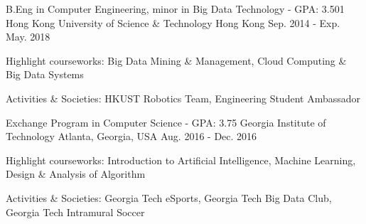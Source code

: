

\begin{cventries}

  \cventry
    {B.Eng in Computer Engineering, minor in Big Data Technology - GPA: 3.501} %
    {Hong Kong University of Science \& Technology} %
    {Hong Kong} %
    {Sep. 2014 - Exp. May. 2018} %
    {
      \begin{cvitems} %
        \item Highlight courseworks: Big Data Mining \& Management, Cloud Computing \& Big Data Systems
        \item Activities \& Societies: HKUST Robotics Team, Engineering Student Ambassador
      \end{cvitems}
    }
   \cventry
    {Exchange Program in Computer Science - GPA: 3.75} %
    {Georgia Institute of Technology} %
    {Atlanta, Georgia, USA} %
    {Aug. 2016 - Dec. 2016} %
    {
      \begin{cvitems} %
        \item Highlight courseworks: Introduction to Artificial Intelligence, Machine Learning, Design \& Analysis of Algorithm
        \item Activities \& Societies: Georgia Tech eSports, Georgia Tech Big Data Club, Georgia Tech Intramural Soccer
      \end{cvitems}
    }

\end{cventries}
